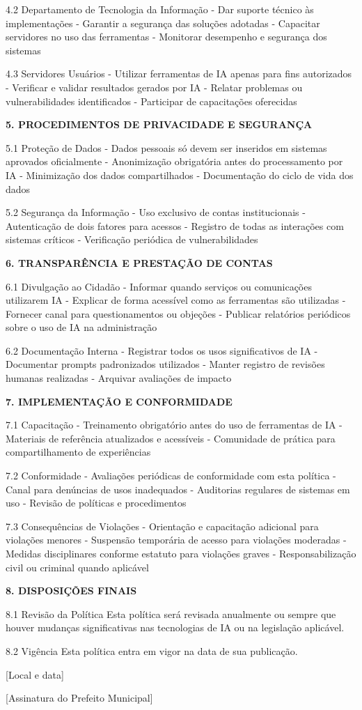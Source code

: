 \documentclass[12pt,a4paper]{book}
\begin{document}
\begin{tcolorbox}[exemplo]
4.2 Departamento de Tecnologia da Informação
- Dar suporte técnico às implementações
- Garantir a segurança das soluções adotadas
- Capacitar servidores no uso das ferramentas
- Monitorar desempenho e segurança dos sistemas

4.3 Servidores Usuários
- Utilizar ferramentas de IA apenas para fins autorizados
- Verificar e validar resultados gerados por IA
- Relatar problemas ou vulnerabilidades identificados
- Participar de capacitações oferecidas

\textbf{5. PROCEDIMENTOS DE PRIVACIDADE E SEGURANÇA}

5.1 Proteção de Dados
- Dados pessoais só devem ser inseridos em sistemas aprovados oficialmente
- Anonimização obrigatória antes do processamento por IA
- Minimização dos dados compartilhados
- Documentação do ciclo de vida dos dados

5.2 Segurança da Informação
- Uso exclusivo de contas institucionais
- Autenticação de dois fatores para acessos
- Registro de todas as interações com sistemas críticos
- Verificação periódica de vulnerabilidades

\textbf{6. TRANSPARÊNCIA E PRESTAÇÃO DE CONTAS}

6.1 Divulgação ao Cidadão
- Informar quando serviços ou comunicações utilizarem IA
- Explicar de forma acessível como as ferramentas são utilizadas
- Fornecer canal para questionamentos ou objeções
- Publicar relatórios periódicos sobre o uso de IA na administração

6.2 Documentação Interna
- Registrar todos os usos significativos de IA
- Documentar prompts padronizados utilizados
- Manter registro de revisões humanas realizadas
- Arquivar avaliações de impacto

\textbf{7. IMPLEMENTAÇÃO E CONFORMIDADE}

7.1 Capacitação
- Treinamento obrigatório antes do uso de ferramentas de IA
- Materiais de referência atualizados e acessíveis
- Comunidade de prática para compartilhamento de experiências

7.2 Conformidade
- Avaliações periódicas de conformidade com esta política
- Canal para denúncias de usos inadequados
- Auditorias regulares de sistemas em uso
- Revisão de políticas e procedimentos

7.3 Consequências de Violações
- Orientação e capacitação adicional para violações menores
- Suspensão temporária de acesso para violações moderadas
- Medidas disciplinares conforme estatuto para violações graves
- Responsabilização civil ou criminal quando aplicável

\textbf{8. DISPOSIÇÕES FINAIS}

8.1 Revisão da Política
Esta política será revisada anualmente ou sempre que houver mudanças significativas nas tecnologias de IA ou na legislação aplicável.

8.2 Vigência
Esta política entra em vigor na data de sua publicação.

[Local e data]

[Assinatura do Prefeito Municipal]
\end{tcolorbox}
\end{document}
